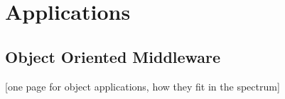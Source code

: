 \documentclass{acm_proc_article-sp}
\begin{document}
% 
% 
% 
% 
% 
% 
% 
% 



\section{Applications}

\subsection{Object Oriented Middleware}

[one page for object applications, how they fit in the spectrum]
\end{document}
